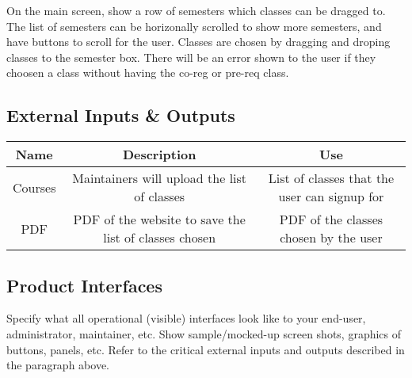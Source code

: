 On the main screen, show a row of semesters which classes can be dragged to.
The list of semesters can be horizonally scrolled to show more semesters, and
have buttons to scroll for the user.
Classes are chosen by dragging and droping classes to the semester box.
There will be an error shown to the user if they choosen a class
without having the co-reg or pre-req class.

\subsection{External Inputs \& Outputs}

\begin{center}
    \begin{tabular}{|c|c|c|}
        \hline
        Name    & Description                                           & Use                                          \\ [0.5ex]
        \hline\hline
        Courses & Maintainers will upload the list of classes           & List of classes that the user can signup for \\
        \hline
        PDF     & PDF of the website to save the list of classes chosen & PDF of the classes chosen by the user        \\
        \hline
    \end{tabular}
\end{center}

\subsection{Product Interfaces}
Specify what all operational (visible) interfaces look like to your
end-user, administrator, maintainer, etc. Show sample/mocked-up screen shots,
graphics of buttons, panels, etc. Refer to the critical external inputs
and outputs described in the paragraph above.
